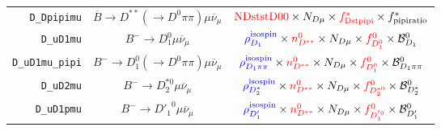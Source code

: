 \begin{landscape}
\begin{table}
\begin{tabular}{r|c|c}
      \texttt{D\_Dpipimu} &  $\overline{B} \rightarrow D^{**} (\rightarrow D^0 \pi\pi) \mu \overline{\nu}_\mu$   &                                                                                                                             $\textcolor{red}{\text{NDststD00}} \times N_{D \mu} \times \textcolor{red}{f^{*}_\text{Dstpipi}} \times f^{*}_\text{pipiratio}$                                                                                                                              \\
        \texttt{D\_uD1mu} &                    $B^- \rightarrow D_1^0 \mu \overline{\nu}_\mu$                    &                                                                                                         $\textcolor{blue}{\rho^\text{isospin}_{D_1}} \times \textcolor{red}{n^{0}_{D^{**}}} \times N_{D \mu} \times \textcolor{red}{f^{0}_{D_1^0}} \times \mathcal{B}^{0}_{D_1}$                                                                                                         \\
  \texttt{D\_uD1mu\_pipi} &       $B^- \rightarrow D_1^0 (\rightarrow D^0 \pi\pi) \mu \overline{\nu}_\mu$        &                                                                                                   $\textcolor{blue}{\rho^\text{isospin}_{D_1\pi\pi}} \times \textcolor{red}{n^{0}_{D^{**}}} \times N_{D \mu} \times \textcolor{red}{f^{0}_{D_1^0}} \times \mathcal{B}^{0}_{D_1\pi\pi}$                                                                                                   \\
        \texttt{D\_uD2mu} &                  $B^- \rightarrow D_2^{*0} \mu \overline{\nu}_\mu$                   &                                                                                                     $\textcolor{blue}{\rho^\text{isospin}_{D_2^*}} \times \textcolor{red}{n^{0}_{D^{**}}} \times N_{D \mu} \times \textcolor{red}{f^{0}_{D_2^{*0}}} \times \mathcal{B}^{0}_{D_2^*}$                                                                                                      \\
       \texttt{D\_uD1pmu} &                  $B^- \rightarrow {D'_1}^0 \mu \overline{\nu}_\mu$                   &                                                                                                      $\textcolor{blue}{\rho^\text{isospin}_{D'_1}} \times \textcolor{red}{n^{0}_{D^{**}}} \times N_{D \mu} \times \textcolor{red}{f^{0}_{D_1^{'0}}} \times \mathcal{B}^{0}_{D'_1}$                                                                                                       \\

\end{tabular}
\end{table}
\end{landscape}
